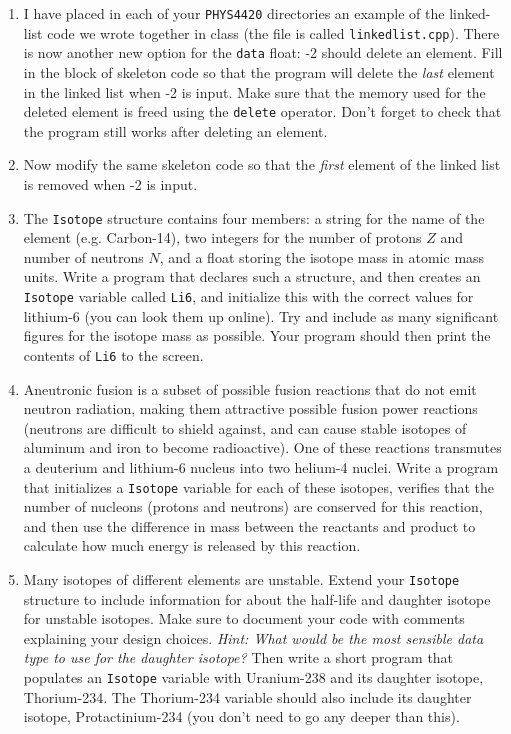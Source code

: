 \documentclass[11pt]{article}
\begin{document}
\begin{enumerate}
    \item I have placed in each of your \texttt{PHYS4420} directories an example
        of the linked-list code we wrote together in class (the file is called
        \texttt{linkedlist.cpp}).  There is now another new option for the \texttt{data}
        float: -2 should delete an element.  Fill in the block of skeleton code
        so that the program will delete the \textit{last} element in the linked
        list when -2 is input.  Make sure that the memory used for the deleted
        element is freed using the \texttt{delete} operator.  Don't forget to
        check that the program still works after deleting an element.
    \item Now modify the same skeleton code so that the \textit{first} element
        of the linked list is removed when -2 is input.
    \item The \texttt{Isotope} structure contains four members: a string for the
        name of the element (e.g. Carbon-14), two integers for the number of
        protons $Z$ and number of neutrons $N$, and a float storing the isotope
        mass in atomic mass units.  Write a program that declares such a
        structure, and then creates an \texttt{Isotope} variable called
        \texttt{Li6}, and initialize this with the correct values for lithium-6
        (you can look them up online).  Try and include as many significant
        figures for the isotope mass as possible.  Your program should then
        print the contents of \texttt{Li6} to the screen.
    \item  Aneutronic fusion is a subset of possible fusion reactions that do
        not emit neutron radiation, making them attractive possible fusion power
        reactions (neutrons are difficult to shield against, and can cause stable
        isotopes of aluminum and iron to become radioactive).  One of these
        reactions transmutes a deuterium and lithium-6 nucleus into two helium-4
        nuclei.  Write a program that initializes a \texttt{Isotope} variable
        for each of these isotopes, verifies that the number of nucleons
        (protons and neutrons) are conserved for this reaction, and then use the
        difference in mass between the reactants and product to calculate how
        much energy is released by this reaction.
    \item Many isotopes of different elements are unstable.  Extend your
        \texttt{Isotope} structure to include information for about the
        half-life and daughter isotope for unstable isotopes.  Make sure to
        document your code with comments explaining your design choices.
        \textit{Hint: What would be the most sensible data type to use for the
        daughter isotope?}  Then write a short program that populates an
        \texttt{Isotope} variable with Uranium-238 and its daughter isotope,
        Thorium-234.  The Thorium-234 variable should also include its daughter
        isotope, Protactinium-234 (you don't need to go any deeper than this).

\end{enumerate}
\end{document}
